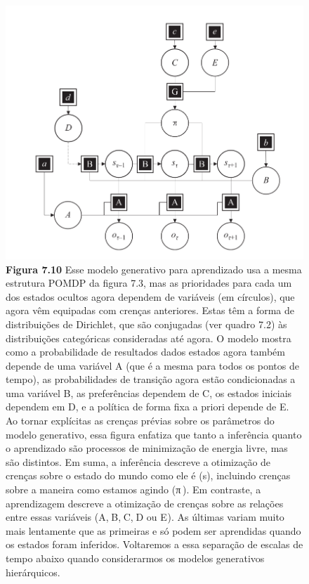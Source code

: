 \documentclass[
  12pt,
]{book}
\begin{document}
\begin{figure}
\centering
\includegraphics{images/Figura_7_10.png}
\caption{\textbf{Figura 7.10} Esse modelo generativo para aprendizado usa a mesma estrutura POMDP da figura 7.3, mas as prioridades para cada um dos estados ocultos agora dependem de variáveis \hspace{0pt}\hspace{0pt}(em círculos), que agora vêm equipadas com crenças anteriores. Estas têm a forma de distribuições de Dirichlet, que são conjugadas (ver quadro 7.2) às distribuições categóricas consideradas até agora. O modelo mostra como a probabilidade de resultados dados estados agora também depende de uma variável A (que é a mesma para todos os pontos de tempo), as probabilidades de transição agora estão condicionadas a uma variável B, as preferências dependem de C, os estados iniciais dependem em D, e a política de forma fixa a priori depende de E. Ao tornar explícitas as crenças prévias sobre os parâmetros do modelo generativo, essa figura enfatiza que tanto a inferência quanto o aprendizado são processos de minimização de energia livre, mas são distintos. Em suma, a inferência descreve a otimização de crenças sobre o estado do mundo como ele é (s), incluindo crenças sobre a maneira como estamos agindo (π ). Em contraste, a aprendizagem descreve a otimização de crenças sobre as relações entre essas variáveis \hspace{0pt}\hspace{0pt}(A,  B,  C,  D ou E ). As últimas variam muito mais lentamente que as primeiras e só podem ser aprendidas quando os estados foram inferidos. Voltaremos a essa separação de escalas de tempo abaixo quando considerarmos os modelos generativos hierárquicos.}
\end{figure}
\end{document}
